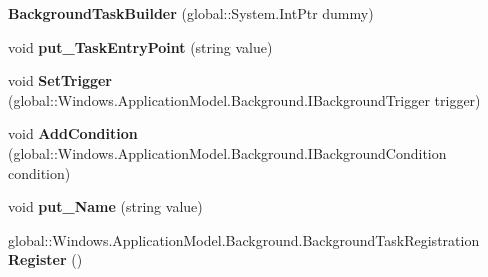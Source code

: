 \begin{DoxyCompactItemize}
\item 
\mbox{\label{class_windows_1_1_application_model_1_1_background_1_1_background_task_builder_ab4df7612969c0e3657f25a103ae10fdb}} 
{\bfseries Background\+Task\+Builder} (global\+::\+System.\+Int\+Ptr dummy)
\item 
\mbox{\label{class_windows_1_1_application_model_1_1_background_1_1_background_task_builder_a35a57878e11b366a14d19cfe9b9168c9}} 
void {\bfseries put\+\_\+\+Task\+Entry\+Point} (string value)
\item 
\mbox{\label{class_windows_1_1_application_model_1_1_background_1_1_background_task_builder_ad3977b98abc7d118a48c9e6d131bc233}} 
void {\bfseries Set\+Trigger} (global\+::\+Windows.\+Application\+Model.\+Background.\+I\+Background\+Trigger trigger)
\item 
\mbox{\label{class_windows_1_1_application_model_1_1_background_1_1_background_task_builder_a9012601dbb13cc38b6863575770044f0}} 
void {\bfseries Add\+Condition} (global\+::\+Windows.\+Application\+Model.\+Background.\+I\+Background\+Condition condition)
\item 
\mbox{\label{class_windows_1_1_application_model_1_1_background_1_1_background_task_builder_a4250f9dec67adfee854b2884069c027b}} 
void {\bfseries put\+\_\+\+Name} (string value)
\item 
\mbox{\label{class_windows_1_1_application_model_1_1_background_1_1_background_task_builder_a97adeab2432933ca3bc4ee6e4852e5a0}} 
global\+::\+Windows.\+Application\+Model.\+Background.\+Background\+Task\+Registration {\bfseries Register} ()
\item 
\mbox{\label{class_windows_1_1_application_model_1_1_background_1_1_background_task_builder_a0739c66afd9bb62e0746d82fc02b1ca0}} 

\end{DoxyCompactItemize}
